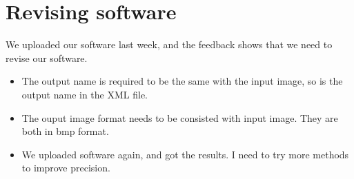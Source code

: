 \documentclass[]{IEEEtran}
\begin{document}
\section{Revising software}
	We uploaded our software last week, and the feedback shows that we need to revise our software.
	\begin{itemize}
		\item The output name is required to be the same with the input image, so is the output name in the XML file. 
		\item The ouput image format needs to be consisted with input image. They are both in bmp format.		
		\item We uploaded software again, and got the results. I need to try more methods to improve precision. 
	\end{itemize}
\newpage
\end{document}
